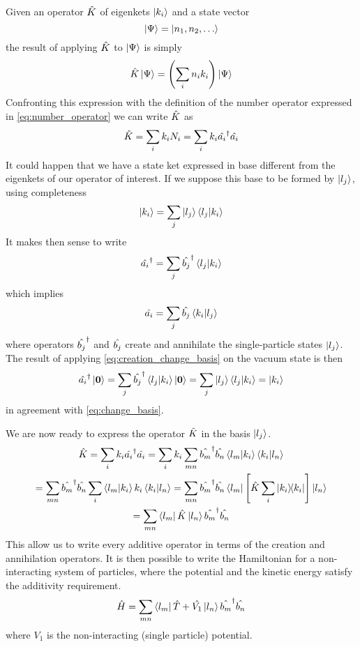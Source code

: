 Given an operator $\hat{K}$ of eigenkets $\ket{k_i}$ and a state vector
\begin{equation}
    \ket{\Psi} = \ket{n_1, n_2, \dots}
\end{equation}
the result of applying $\hat{K}$ to $\ket{\Psi}$ is simply
\begin{equation}
    \hat{K}\ket{\Psi} = \left( \sum_i n_i k_i \right) \ket{\Psi}
\end{equation}
Confronting this expression with the definition of the number operator expressed in \cref{eq:number_operator} we can write $\hat{K}$ as
\begin{equation}
    \hat{K} = \sum_i k_i N_i = \sum_i k_i  \hat{a_i}^\dagger\hat{a_i}
\end{equation}
It could happen that we have a state ket expressed in base different from the eigenkets of our operator of interest. If we suppose this base to be formed by $\ket{l_j}$, using completeness
\begin{equation} \label{eq:change_basis}
    \ket{k_i} = \sum_j \ket{l_j} \braket{l_j}{k_i}
\end{equation}
It makes then sense to write
\begin{equation} \label{eq:creation_change_basis}
    \hat{a_i}^\dagger = \sum_j \hat{b_j}^\dagger \braket{l_j}{k_i}
\end{equation}
which implies
\begin{equation}
    \hat{a_i} = \sum_j \hat{b_j} \braket{k_i}{l_j}
\end{equation}
where operators $\hat{b_j}^\dagger$ and $\hat{b_j}$ create and annihilate the single-particle states $\ket{l_j}$. The result of applying \cref{eq:creation_change_basis} on the vacuum state is then
\begin{equation}
    \hat{a_i}^\dagger \ket{\mathbf{0}} = \sum_j \hat{b_j}^\dagger \braket{l_j}{k_i} \ket{\mathbf{0}} = \sum_j \ket{l_j} \braket{l_j}{k_i} = \ket{k_i}
\end{equation}
in agreement with \cref{eq:change_basis}.

We are now ready to express the operator $\hat{K}$ in the basis $\ket{l_j}$.
\begin{multline}
    \hat{K} =  \sum_i k_i  \hat{a_i}^\dagger\hat{a_i}
    = \sum_i k_i \sum_{mn} \hat{b_m}^\dagger\hat{b_n} \braket{l_m}{k_i}\braket{k_i}{l_n}
    \\ = \sum_{mn} \hat{b_m}^\dagger\hat{b_n} \sum_i \braket{l_m}{k_i} k_i \braket{k_i}{l_n}
    = \sum_{mn} \hat{b_m}^\dagger\hat{b_n} \bra{l_m} \left[ \hat{K} \sum_i \op{k_i} \right] \ket{l_n}
    \\= \sum_{mn}  \bra{l_m}\hat{K}\ket{l_n} \hat{b_m}^\dagger\hat{b_n}
\end{multline}
This allow us to write every additive operator in terms of the creation and annihilation operators. It is then possible to write the Hamiltonian for a non-interacting system of particles, where the potential and the kinetic energy satisfy the additivity requirement.
\begin{equation}
    \hat{H} = \sum_{mn} \bra{l_m}\hat{T}+\hat{V_1}\ket{l_n} \hat{b_m}^\dagger\hat{b_n}
\end{equation}
where $V_1$ is the non-interacting (single particle) potential.